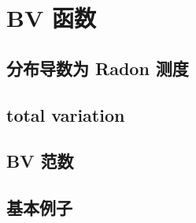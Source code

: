 \section{BV 函数}
\label{b1:sec:2701}


\subsection{分布导数为 Radon 测度}
\label{b1:subsec:270101}

\subsection{total variation}
\label{b1:subsec:270102}

\subsection{BV 范数}
\label{b1:subsec:270103}

\subsection{基本例子}
\label{b1:subsec:270104}



